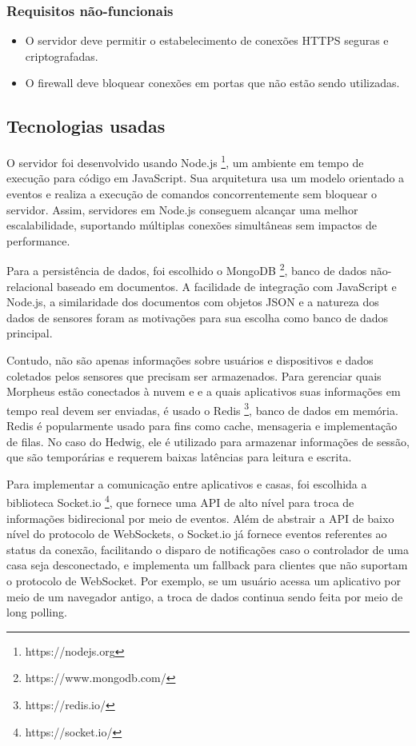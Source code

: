 \subsubsection{Requisitos não-funcionais}

\begin{itemize}
\item O servidor deve permitir o estabelecimento de conexões HTTPS seguras e criptografadas.
\item O firewall deve bloquear conexões em portas que não estão sendo utilizadas.
\end{itemize}

\subsection{Tecnologias usadas}

O servidor foi desenvolvido usando Node.js \footnote{https://nodejs.org}, um ambiente em tempo de execução para código em JavaScript. Sua arquitetura usa um modelo orientado a eventos e realiza a execução de comandos concorrentemente sem bloquear o servidor. Assim, servidores em Node.js conseguem alcançar uma melhor escalabilidade, suportando múltiplas conexões simultâneas sem impactos de performance.

Para a persistência de dados, foi escolhido o MongoDB \footnote{https://www.mongodb.com/}, banco de dados não-relacional baseado em documentos. A facilidade de integração com JavaScript e Node.js, a similaridade dos documentos com objetos JSON e a natureza dos dados de sensores foram as motivações para sua escolha como banco de dados principal.

Contudo, não são apenas informações sobre usuários e dispositivos e dados coletados pelos sensores que precisam ser armazenados. Para gerenciar quais Morpheus estão conectados à nuvem e e a quais aplicativos suas informações em tempo real devem ser enviadas, é usado o Redis \footnote{https://redis.io/}, banco de dados em memória. Redis é popularmente usado para fins como cache, mensageria e implementação de filas. No caso do Hedwig, ele é utilizado para armazenar informações de sessão, que são temporárias e requerem baixas latências para leitura e escrita.

Para implementar a comunicação entre aplicativos e casas, foi escolhida a biblioteca Socket.io \footnote{https://socket.io/}, que fornece uma API de alto nível para troca de informações bidirecional por meio de eventos. Além de abstrair a API de baixo nível do protocolo de WebSockets, o Socket.io já fornece eventos referentes ao status da conexão, facilitando o disparo de notificações caso o controlador de uma casa seja desconectado, e implementa um fallback para clientes que não suportam o protocolo de WebSocket. Por exemplo, se um usuário acessa um aplicativo por meio de um navegador antigo, a troca de dados continua sendo feita por meio de long polling.

